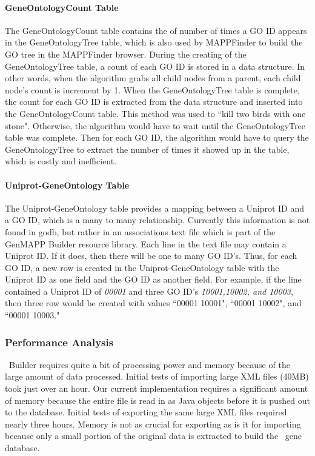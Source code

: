 \paragraph{GeneOntologyCount Table}
The GeneOntologyCount table contains the of number of times a GO ID appears in the GeneOntologyTree table, which
is also used by MAPPFinder to build the GO tree in the MAPPFinder browser. During the creating of the GeneOntologyTree
table, a count of each GO ID is stored in a data structure. In other words, when the algorithm grabs all child nodes from
a parent, each child node's count is increment by 1. When the GeneOntologyTree table is complete, the count for
each GO ID is extracted from the data structure and inserted into the GeneOntologyCount table.
This method was used to ``kill two birds with one stone". Otherwise,
the algorithm would have to wait until the GeneOntologyTree table was complete. Then for each GO ID, the algorithm would have
to query the GeneOntologyTree to extract the number of times it showed up in the table, which is costly and inefficient.


\paragraph{Uniprot-GeneOntology Table}
The Uniprot-GeneOntology table provides a mapping between a Uniprot ID and a GO ID, which is a many to many relationship.
Currently this information is not found in godb, but rather in an associations text file which is part of the GenMAPP Builder
resource library. Each line in the text file may contain a Uniprot ID. If it does, then there will be one to many GO ID's.
Thus, for each GO ID, a new row is created in the Uniprot-GeneOntology table with the Uniprot ID as one field and the GO ID
as another field. For example, if the line contained a Uniprot ID of \emph{00001} and three GO ID's \emph{10001,10002, and 10003},
then three row would be created with values ``00001 10001", ``00001 10002", and ``00001 10003."

\subsubsection{Performance Analysis}
\genmapp~Builder requires quite a bit of processing power and memory because of the large amount of data processed.  Initial tests of importing large XML files (40MB) took just over an hour.  Our current implementation requires a significant amount of memory because the entire file is read in as Java objects before it is pushed out to the database. Initial tests of exporting the same large XML files required nearly three hours.  Memory is not as crucial for exporting as is it for importing because only a small portion of the original data is extracted to build the \genmapp~gene database.

